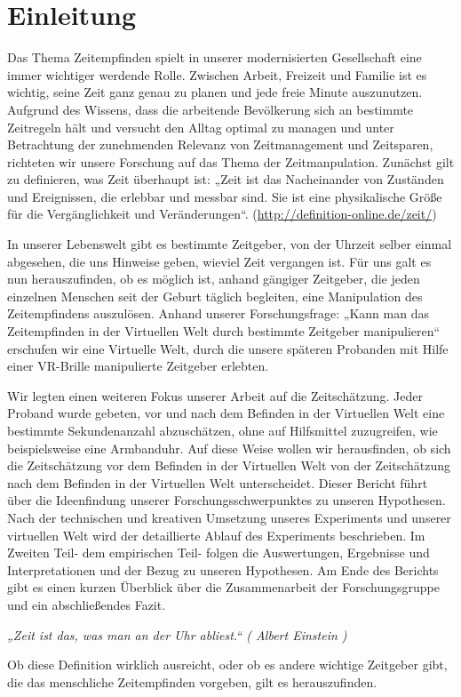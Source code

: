 \documentclass{Bericht}
\begin{document}
\maketitle


\tableofcontents
\clearpage

\section{Einleitung}
Das Thema Zeitempfinden spielt in unserer modernisierten Gesellschaft eine immer wichtiger werdende Rolle. Zwischen Arbeit, Freizeit und Familie ist es wichtig, seine Zeit ganz genau zu planen und jede freie Minute auszunutzen. Aufgrund des Wissens, dass die arbeitende Bevölkerung sich an bestimmte Zeitregeln hält und versucht den Alltag optimal zu managen und unter Betrachtung der zunehmenden Relevanz von Zeitmanagement und Zeitsparen, richteten wir unsere Forschung auf das Thema der Zeitmanpulation. Zunächst gilt zu definieren, was Zeit überhaupt ist: „Zeit ist das Nacheinander von Zuständen und Ereignissen, die erlebbar und messbar sind. Sie ist eine physikalische Größe für die Vergänglichkeit und Veränderungen“. (\underline{http://definition-online.de/zeit/}) 
	\par
	In unserer Lebenswelt gibt es bestimmte Zeitgeber, von der Uhrzeit selber einmal abgesehen, die uns Hinweise geben, wieviel Zeit vergangen ist. Für uns galt es nun herauszufinden, ob es möglich ist, anhand gängiger Zeitgeber, die jeden einzelnen Menschen seit der Geburt täglich begleiten, eine Manipulation des Zeitempfindens auszulösen. Anhand unserer Forschungsfrage: „Kann man das Zeitempfinden in der Virtuellen Welt durch bestimmte Zeitgeber manipulieren“ erschufen wir eine Virtuelle Welt, durch die unsere späteren Probanden mit Hilfe einer VR-Brille manipulierte Zeitgeber erlebten. 
	\par
	 Wir legten einen weiteren Fokus unserer Arbeit auf die Zeitschätzung. Jeder Proband wurde gebeten, vor und nach dem Befinden in der Virtuellen Welt eine bestimmte Sekundenanzahl abzuschätzen, ohne auf Hilfsmittel zuzugreifen, wie beispielsweise eine Armbanduhr. Auf diese Weise wollen wir herausfinden, ob sich die Zeitschätzung vor dem Befinden in der Virtuellen Welt von der Zeitschätzung nach dem Befinden in der Virtuellen Welt unterscheidet.
Dieser Bericht führt über die Ideenfindung unserer Forschungsschwerpunktes zu unseren Hypothesen. Nach der technischen und kreativen Umsetzung unseres Experiments und unserer virtuellen Welt wird der detaillierte Ablauf des Experiments beschrieben. Im Zweiten Teil- dem empirischen Teil- folgen die Auswertungen, Ergebnisse und Interpretationen und der Bezug zu unseren Hypothesen. Am Ende des Berichts gibt es einen kurzen Überblick über die Zusammenarbeit der Forschungsgruppe und ein abschließendes Fazit. 
\par
 \textit{„Zeit ist das, was man an der Uhr abliest.“ ( Albert Einstein )}
 \par
  Ob diese Definition wirklich ausreicht, oder ob es andere wichtige Zeitgeber gibt, die das menschliche Zeitempfinden vorgeben, gilt es herauszufinden. 
\end{document}
